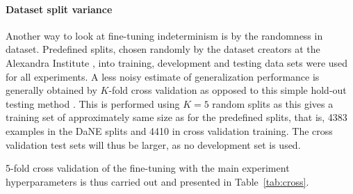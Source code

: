 \documentclass[main.tex]{subfiles}
\begin{document}
\paragraph{Dataset split variance}
Another way to look at fine-tuning indeterminism is by the randomness in dataset.
Predefined splits, chosen randomly by the dataset creators at the Alexandra Institute \cite{hvingelby2020dane}, into training, development and testing data sets were used for all experiments.
A less noisy estimate of generalization performance is generally obtained by $K$-fold cross validation as opposed to this simple hold-out testing method \cite[Sec. 1.3]{bishop2006pattern}.
This is performed using $K=5$ random splits as this gives a training set of approximately same size as for the predefined splits, that is, 4383 examples in the DaNE splits and 4410 in cross validation training.
The cross validation test sets will thus be larger, as no development set is used.

5-fold cross validation of the fine-tuning with the main experiment hyperparameters is thus carried out and presented in Table~\ref{tab:cross}.









\end{document}
